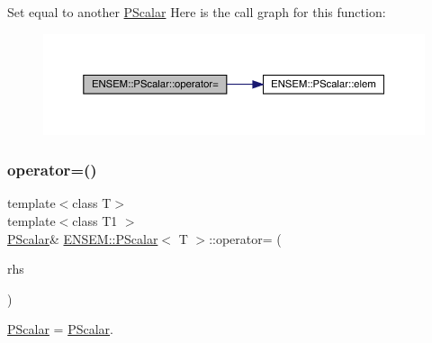 Set equal to another \mbox{\hyperlink{classENSEM_1_1PScalar}{P\+Scalar}} Here is the call graph for this function\+:
\nopagebreak
\begin{figure}[H]
\begin{center}
\leavevmode
\includegraphics[width=350pt]{d3/d27/classENSEM_1_1PScalar_ae69d6f1ad8ec0b65652f8d16c5f97b11_cgraph}
\end{center}
\end{figure}
\mbox{\label{classENSEM_1_1PScalar_ae69d6f1ad8ec0b65652f8d16c5f97b11}} 
\subsubsection{\texorpdfstring{operator=()}{operator=()}\hspace{0.1cm}{\footnotesize\ttfamily [6/6]}}
{\footnotesize\ttfamily template$<$class T$>$ \\
template$<$class T1 $>$ \\
\mbox{\hyperlink{classENSEM_1_1PScalar}{P\+Scalar}}\& \mbox{\hyperlink{classENSEM_1_1PScalar}{E\+N\+S\+E\+M\+::\+P\+Scalar}}$<$ T $>$\+::operator= (\begin{DoxyParamCaption}\item[{const \mbox{\hyperlink{classENSEM_1_1PScalar}{P\+Scalar}}$<$ T1 $>$ \&}]{rhs }\end{DoxyParamCaption})\hspace{0.3cm}{\ttfamily [inline]}}



\mbox{\hyperlink{classENSEM_1_1PScalar}{P\+Scalar}} = \mbox{\hyperlink{classENSEM_1_1PScalar}{P\+Scalar}}. 

